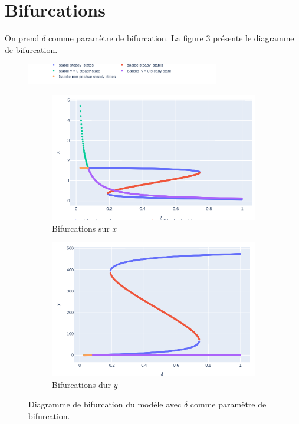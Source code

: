\documentclass[12pt]{article}
\begin{document}
\section{Bifurcations}
On prend $\delta$ comme paramètre de bifurcation. La figure \ref{fig::bifurcations} présente le diagramme de bifurcation.
\begin{figure}[!ht]
    \centering
    \includegraphics[width=0.75\textwidth]{../figures/fig_bifurcation_legend.png}
    \begin{subfigure}[b]{0.49\textwidth}
         \centering
         \includegraphics[width=\textwidth]{../figures/fig_bifurcation_x.png}
         \caption{Bifurcations sur $x$}
         \label{fig::bifurcations_x}
     \end{subfigure}
     \hfill
    \begin{subfigure}[b]{0.49\textwidth}
         \centering
         \includegraphics[width=\textwidth]{../figures/fig_bifurcation_y.png}
         \caption{Bifurcations dur $y$}
         \label{fig::bifurcations_y}
     \end{subfigure}
    \caption{Diagramme de bifurcation du modèle avec $\delta$ comme paramètre de bifurcation.}
    \label{fig::bifurcations}
\end{figure}
\end{document}
